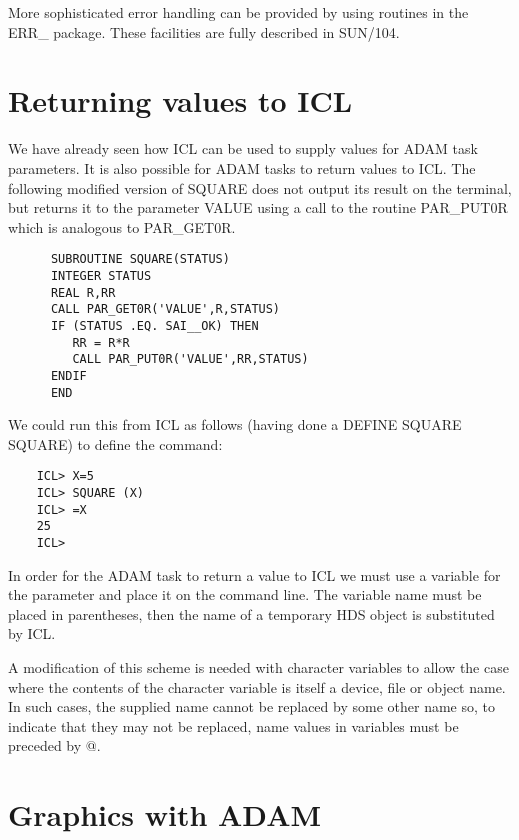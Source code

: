 \documentclass[twoside,11pt]{report}
\newcommand{\xlabel}[1]{}
\begin{document}
More sophisticated error handling can be provided by using routines in the
ERR\_ package. These facilities are fully described in SUN/104.

\section{\xlabel{returning_values_to_icl}Returning values to ICL}
\label{retval}
We have already seen how ICL can be used to supply values for ADAM task
parameters. It is also possible for ADAM tasks to return values to ICL.
The following modified version of SQUARE does not output its result on the
terminal, but returns it to the parameter VALUE using a call to the routine
PAR\_PUT0R which is analogous to PAR\_GET0R.

\begin{verbatim}
      SUBROUTINE SQUARE(STATUS)
      INTEGER STATUS
      REAL R,RR
      CALL PAR_GET0R('VALUE',R,STATUS)
      IF (STATUS .EQ. SAI__OK) THEN
         RR = R*R
         CALL PAR_PUT0R('VALUE',RR,STATUS)
      ENDIF
      END
\end{verbatim}

We could run this from ICL as follows (having done a DEFINE SQUARE SQUARE)
to define the command:

\begin{verbatim}
    ICL> X=5
    ICL> SQUARE (X)
    ICL> =X
    25
    ICL>
\end{verbatim}

In order for the ADAM task to return a value to ICL we must use a variable
for the parameter and place it on the command line. The variable name must
be placed in parentheses, then the name of a temporary HDS object is
substituted by ICL.

A modification of this scheme is needed with character variables to allow the
case where the contents of the character variable is itself a device, file or
object name.
In such cases, the supplied name cannot be replaced by some other name so,
to indicate that they may not be replaced, name values in variables must be
preceded by @.

\section{\xlabel{graphics_with_adam_}Graphics with ADAM}
\end{document}
